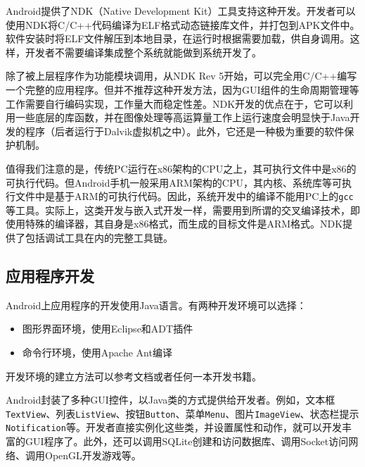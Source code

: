 Android提供了NDK（Native Development Kit）工具支持这种开发。开发者可以使用NDK将C/C++代码编译为ELF格式动态链接库文件，并打包到APK文件中。软件安装时将ELF文件解压到本地目录，在运行时根据需要加载，供自身调用。这样，开发者不需要编译集成整个系统就能做到系统开发了。

除了被上层程序作为功能模块调用，从NDK Rev 5开始，可以完全用C/C++编写一个完整的应用程序。但并不推荐这种开发方法，因为GUI组件的生命周期管理等工作需要自行编码实现，工作量大而稳定性差。NDK开发的优点在于，它可以利用一些底层的库函数，并在图像处理等高运算量工作上运行速度会明显快于Java开发的程序（后者运行于Dalvik虚拟机之中）。此外，它还是一种极为重要的软件保护机制。

值得我们注意的是，传统PC运行在x86架构的CPU之上，其可执行文件中是x86的可执行代码。但Android手机一般采用ARM架构的CPU，其内核、系统库等可执行文件中是基于ARM的可执行代码。因此，系统开发中的编译不能用PC上的\lstinline!gcc!等工具。实际上，这类开发与嵌入式开发一样，需要用到所谓的交叉编译技术，即使用特殊的编译器，其自身是x86格式，而生成的目标文件是ARM格式。NDK提供了包括调试工具在内的完整工具链。

\subsection{应用程序开发}
Android上应用程序的开发使用Java语言。有两种开发环境可以选择：
\begin{itemize}
  \item 图形界面环境，使用Eclipse和ADT插件
  \item 命令行环境，使用Apache Ant编译
\end{itemize}
开发环境的建立方法可以参考文档或者任何一本开发书籍。

Android封装了多种GUI控件，以Java类的方式提供给开发者。例如，文本框\lstinline!TextView!、列表\lstinline!ListView!、按钮\lstinline!Button!、菜单\lstinline!Menu!、图片\lstinline!ImageView!、状态栏提示\lstinline!Notification!等。开发者直接实例化这些类，并设置属性和动作，就可以开发丰富的GUI程序了。此外，还可以调用SQLite创建和访问数据库、调用Socket访问网络、调用OpenGL开发游戏等。

